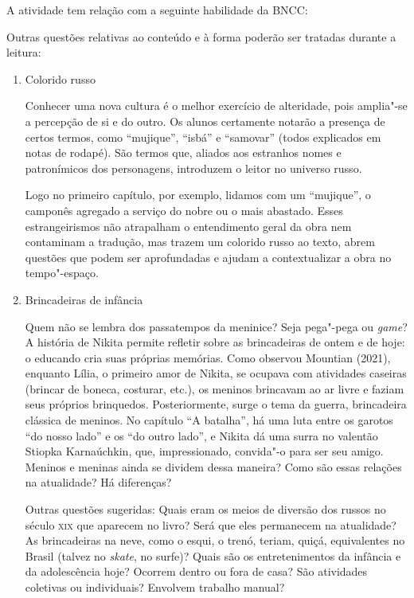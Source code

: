 \documentclass[11pt]{extarticle}
\begin{document}
A atividade tem relação com a seguinte habilidade da BNCC: 


Outras questões relativas ao conteúdo e à forma poderão ser tratadas durante a leitura:

\begin{enumerate}
\item
Colorido russo

Conhecer uma nova cultura é o melhor exercício de alteridade, pois
amplia"-se a percepção de si e do outro. Os alunos certamente notarão a
presença de certos termos, como ``mujique'', ``isbá'' e ``samovar''
(todos explicados em notas de rodapé). São termos que, aliados aos
estranhos nomes e patronímicos dos personagens, introduzem o leitor no
universo russo.


Logo no primeiro capítulo, por exemplo, lidamos com um ``mujique'', o
camponês agregado a serviço do nobre ou o mais abastado. Esses
estrangeirismos não atrapalham o entendimento geral da obra nem
contaminam a tradução, mas trazem um colorido russo ao texto, abrem
questões que podem ser aprofundadas e ajudam a contextualizar a obra no
tempo"-espaço.


\item
Brincadeiras de infância

Quem não se lembra dos passatempos da meninice? Seja pega"-pega ou
\emph{game}? A história de Nikita permite refletir sobre as brincadeiras
de ontem e de hoje: o educando cria suas próprias memórias. Como
observou Mountian (2021), enquanto Lília, o primeiro amor de
Nikita, se ocupava com atividades caseiras (brincar de boneca, costurar,
etc.), os meninos brincavam ao ar livre e faziam seus próprios
brinquedos. Posteriormente, surge o
tema da guerra, brincadeira clássica de meninos. No capítulo ``A
batalha'', há uma luta entre os garotos ``do nosso lado'' e os ``do
outro lado'', e Nikita dá uma surra no valentão Stiopka Karnaúchkin,
que, impressionado, convida"-o para ser seu amigo. Meninos e meninas ainda se
dividem dessa maneira? Como são essas relações na atualidade? Há diferenças? 

Outras questões sugeridas: Quais eram os meios de diversão dos russos
no século \textsc{xix} que aparecem no livro? Será que eles permanecem na
atualidade? As brincadeiras na neve, como o esqui, o trenó, teriam,
quiçá, equivalentes no Brasil (talvez no \emph{skate}, no surfe)? Quais
são os entretenimentos da infância e da adolescência hoje? Ocorrem
dentro ou fora de casa? São atividades coletivas ou individuais?
Envolvem trabalho manual?


\end{enumerate}
\end{document}
